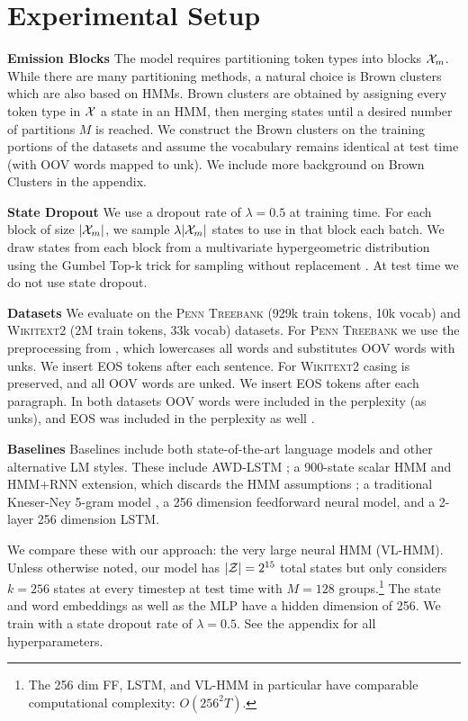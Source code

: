 \documentclass[11pt,a4paper]{article}
\begin{document}
\section{Experimental Setup}
\label{sec:experiments}

\noindent\textbf{Emission Blocks}
The model requires partitioning token types into blocks $\mathcal{X}_m$. 
While there are many partitioning methods, a natural choice
is Brown clusters \citep{brown1992,liang2005brown} which are also based on HMMs.
Brown clusters are obtained by assigning every token type in $\mathcal{X}$ a state in an HMM,
then merging states until a desired number of partitions $M$ is reached.
We construct the Brown clusters on the training portions of the datasets
and assume the vocabulary remains identical at test time (with OOV words mapped to unk).
We include more background on Brown Clusters in the appendix.

\noindent\textbf{State Dropout}
We use a dropout rate of $\lambda = 0.5$ at training time. 
For each block of size $|\mathcal{X}_m|$, we sample $\lambda|\mathcal{X}_m|$ states to use in that block each batch.
We draw states from each block from a multivariate hypergeometric distribution
using the Gumbel Top-k trick for sampling without replacement \citep{vieira2014gumbel}.
At test time we do not use state dropout.

\noindent \textbf{Datasets}
We evaluate on the \textsc{Penn Treebank} \citep{ptb} (929k train tokens, 10k vocab)
and \textsc{Wikitext2} \citep{wikitext} (2M train tokens, 33k vocab) datasets.
For \textsc{Penn Treebank} we use the preprocessing from \citet{mikolov-2011},
which lowercases all words and substitutes OOV words with unks. 
We insert EOS tokens after each sentence.
For \textsc{Wikitext2} casing is preserved, and all OOV words are unked.
We insert EOS tokens after each paragraph.
In both datasets OOV words were included in the perplexity (as unks),
and EOS was included in the perplexity as well \citep{merity2017awdlstm}.

\noindent \textbf{Baselines}
Baselines include both state-of-the-art language models 
and other alternative LM styles. 
These include AWD-LSTM \citep{merity2017awdlstm};
a 900-state scalar HMM and HMM+RNN extension,
which discards the HMM assumptions \citep{buys2018hmm};
a traditional Kneser-Ney 5-gram model \citep{mikolov2012rnn,kenlm},
a 256 dimension feedforward neural model,
and a 2-layer 256 dimension LSTM.

We compare these with our approach: the very large neural HMM (VL-HMM).
Unless otherwise noted, our model has $|\mathcal{Z}|=2^{15}$ total states 
but only considers $k=256$ states at every timestep at
test time with $M=128$ groups.\footnote{
The 256 dim FF, LSTM, and VL-HMM in particular
have comparable computational complexity: $O(256^2 T)$.
}
The state and word embeddings as well as the MLP have a hidden dimension of 256.
We train with a state dropout rate of $\lambda=0.5$.
See the appendix for all hyperparameters.
\end{document}
